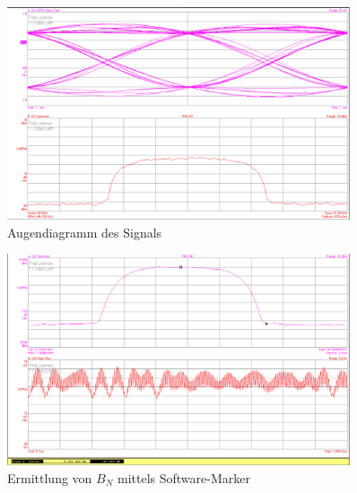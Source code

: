 \documentclass[12pt,a4paper,ngerman]{article}
\begin{document}
\begin{figure}[H]
\centering
\includegraphics[width=0.9\textwidth]{figures/Aufgabe1_QPSK_demod_i_eye.jpg} 
\caption{Augendiagramm des Signals}
\label{fig:1_auge}
\end{figure}

\pagebreak

\begin{figure}[H]
\centering
\includegraphics[width=0.9\textwidth]{figures/Aufgabe1_QPSK_B.jpg} 
\caption{Ermittlung von $B_N$ mittels Software-Marker}
\label{fig:1_bn}
\end{figure}
\end{document}
